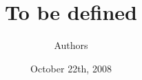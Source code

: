 \documentclass{IEEEtran}
\title{To be defined}
\author{Authors}
\date{October 22th, 2008}
\begin{document}
\maketitle

\begin{abstract}

\end{abstract}





\end{document}
